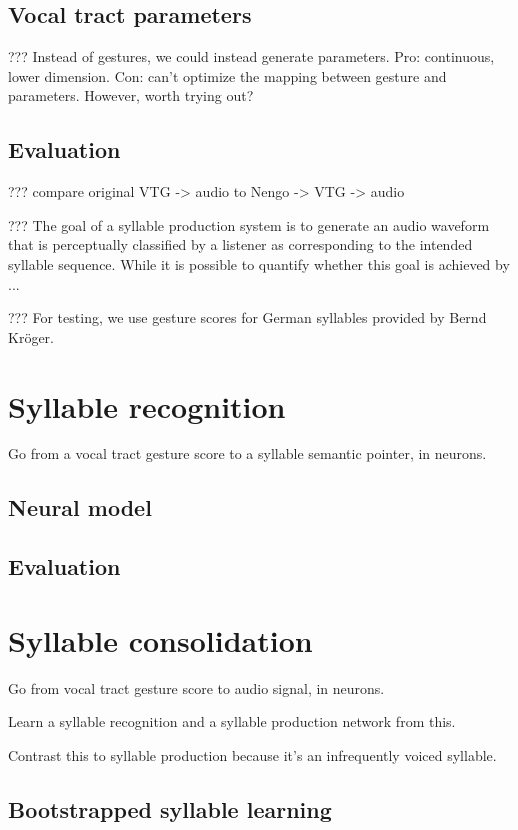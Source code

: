 \subsection{Vocal tract parameters}

??? Instead of gestures, we could instead
generate parameters. Pro: continuous, lower dimension.
Con: can't optimize the mapping between
gesture and parameters.
However, worth trying out?

\subsection{Evaluation}

??? compare original VTG -> audio to Nengo -> VTG -> audio

??? The goal of a syllable production system
is to generate an audio waveform
that is perceptually classified
by a listener as corresponding to
the intended syllable sequence.
While it is possible to quantify
whether this goal is achieved
by ...

??? For testing, we use gesture scores
for German syllables
provided by Bernd Kr\"{o}ger.

\section{Syllable recognition}

Go from a vocal tract gesture score
to a syllable semantic pointer, in neurons.

\subsection{Neural model}

\subsection{Evaluation}

\section{Syllable consolidation}

Go from vocal tract gesture score
to audio signal, in neurons.

Learn a syllable recognition
and a syllable production
network from this.

Contrast this to syllable production because it's
an infrequently voiced syllable.

\subsection{Bootstrapped syllable learning}

